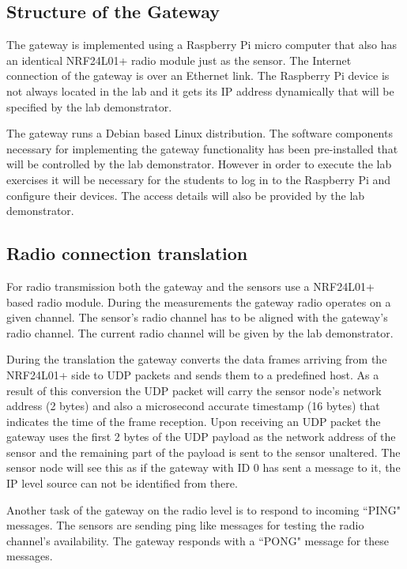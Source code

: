 \documentclass[a4paper]{article}
\begin{document}
\subsection{Structure of the Gateway}

The gateway is implemented using a Raspberry Pi micro computer that also has an identical NRF24L01+
radio module just as the sensor. The Internet connection of the gateway is over an Ethernet link.
The Raspberry Pi device is not always located in the lab and it gets its IP address dynamically
that will be specified by the lab demonstrator.

The gateway runs a Debian based Linux distribution. The software components necessary for
implementing the gateway functionality has been pre-installed that will be controlled by the
lab demonstrator. However in order to execute the lab exercises it will be necessary for the students
to log in to the Raspberry Pi and configure their devices. The access details will also be provided
by the lab demonstrator.

\subsection{Radio connection translation}

For radio transmission both the gateway and the sensors use a NRF24L01+ based radio module.
During the measurements the gateway radio operates on a given channel. The sensor's radio
channel has to be aligned with the gateway's radio channel. The current radio channel will be
given by the lab demonstrator.

During the translation the gateway converts the data frames arriving from the NRF24L01+ side 
to UDP packets and sends them to a predefined host. As a result of this conversion the
UDP packet will carry the sensor node's network address (2 bytes) and also a microsecond accurate
timestamp (16 bytes) that indicates the time of the frame reception.
Upon receiving an UDP packet the gateway uses the first 2 bytes of the UDP payload as the
network address of the sensor and the remaining part of the payload is sent to the sensor unaltered.
The sensor node will see this as if the gateway with ID 0 has sent a message to it, the IP level source
can not be identified from there.

Another task of the gateway on the radio level is to respond to incoming ``PING" messages. 
The sensors are sending ping like messages for testing the radio channel's availability.
The gateway responds with a ``PONG" message for these messages.
\end{document}
